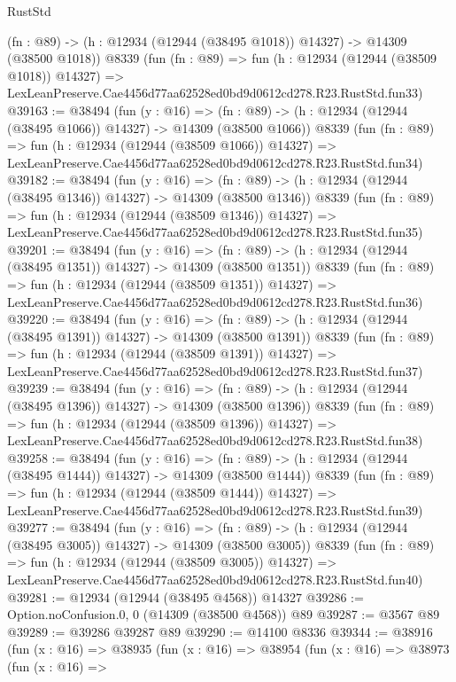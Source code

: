 \begin{lexlean}{RustStd}
\begin{coremodule}
    (fn : @89) -> (h : @12934 (@12944 (@38495 @1018)) @14327) -> @14309 (@38500 @1018))
    @8339
    (fun (fn : @89) =>
    fun (h : @12934 (@12944 (@38509 @1018)) @14327) =>
    LexLeanPreserve.Cae4456d77aa62528ed0bd9d0612cd278.R23.RustStd.fun33)
@39163 := @38494
    (fun (y : @16) =>
    (fn : @89) -> (h : @12934 (@12944 (@38495 @1066)) @14327) -> @14309 (@38500 @1066))
    @8339
    (fun (fn : @89) =>
    fun (h : @12934 (@12944 (@38509 @1066)) @14327) =>
    LexLeanPreserve.Cae4456d77aa62528ed0bd9d0612cd278.R23.RustStd.fun34)
@39182 := @38494
    (fun (y : @16) =>
    (fn : @89) -> (h : @12934 (@12944 (@38495 @1346)) @14327) -> @14309 (@38500 @1346))
    @8339
    (fun (fn : @89) =>
    fun (h : @12934 (@12944 (@38509 @1346)) @14327) =>
    LexLeanPreserve.Cae4456d77aa62528ed0bd9d0612cd278.R23.RustStd.fun35)
@39201 := @38494
    (fun (y : @16) =>
    (fn : @89) -> (h : @12934 (@12944 (@38495 @1351)) @14327) -> @14309 (@38500 @1351))
    @8339
    (fun (fn : @89) =>
    fun (h : @12934 (@12944 (@38509 @1351)) @14327) =>
    LexLeanPreserve.Cae4456d77aa62528ed0bd9d0612cd278.R23.RustStd.fun36)
@39220 := @38494
    (fun (y : @16) =>
    (fn : @89) -> (h : @12934 (@12944 (@38495 @1391)) @14327) -> @14309 (@38500 @1391))
    @8339
    (fun (fn : @89) =>
    fun (h : @12934 (@12944 (@38509 @1391)) @14327) =>
    LexLeanPreserve.Cae4456d77aa62528ed0bd9d0612cd278.R23.RustStd.fun37)
@39239 := @38494
    (fun (y : @16) =>
    (fn : @89) -> (h : @12934 (@12944 (@38495 @1396)) @14327) -> @14309 (@38500 @1396))
    @8339
    (fun (fn : @89) =>
    fun (h : @12934 (@12944 (@38509 @1396)) @14327) =>
    LexLeanPreserve.Cae4456d77aa62528ed0bd9d0612cd278.R23.RustStd.fun38)
@39258 := @38494
    (fun (y : @16) =>
    (fn : @89) -> (h : @12934 (@12944 (@38495 @1444)) @14327) -> @14309 (@38500 @1444))
    @8339
    (fun (fn : @89) =>
    fun (h : @12934 (@12944 (@38509 @1444)) @14327) =>
    LexLeanPreserve.Cae4456d77aa62528ed0bd9d0612cd278.R23.RustStd.fun39)
@39277 := @38494
    (fun (y : @16) =>
    (fn : @89) -> (h : @12934 (@12944 (@38495 @3005)) @14327) -> @14309 (@38500 @3005))
    @8339
    (fun (fn : @89) =>
    fun (h : @12934 (@12944 (@38509 @3005)) @14327) =>
    LexLeanPreserve.Cae4456d77aa62528ed0bd9d0612cd278.R23.RustStd.fun40)
@39281 := @12934 (@12944 (@38495 @4568)) @14327
@39286 := Option.noConfusion.{0, 0} (@14309 (@38500 @4568)) @89
@39287 := @3567 @89
@39289 := @39286 @39287 @89
@39290 := @14100 @8336
@39344 := @38916
    (fun (x : @16) =>
    @38935
      (fun (x : @16) =>
      @38954
        (fun (x : @16) =>
        @38973
          (fun (x : @16) =>

\end{coremodule}
\end{lexlean}
